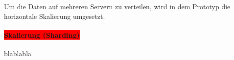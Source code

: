 Um die Daten auf mehreren Servern zu verteilen, wird in dem Prototyp die horizontale Skalierung umgesetzt.

\paragraph{\colorbox{red}{Skalierung (Sharding)}}
blablabla







